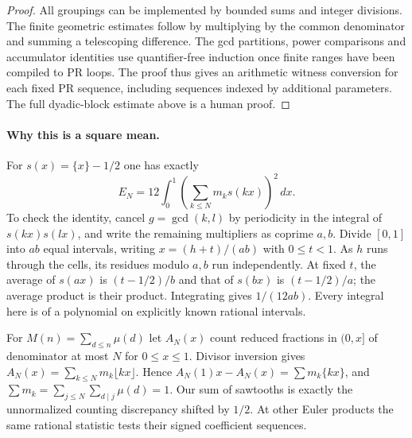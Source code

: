 \begin{proof}
All groupings can be implemented by bounded sums and integer divisions. The finite geometric estimates follow by multiplying by the common denominator and summing a telescoping difference. The gcd partitions, power comparisons and accumulator identities use quantifier-free induction once finite ranges have been compiled to PR loops. The proof thus gives an arithmetic witness conversion for each fixed PR sequence, including sequences indexed by additional parameters. The full dyadic-block estimate above is a human proof.
\end{proof}

\paragraph{Why this is a square mean.}
For $s(x)=\{x\}-1/2$ one has exactly
\[
 E_N=12\int_0^1\left(\sum_{k\le N}m_k s(kx)\right)^2\,dx .
\]
To check the identity, cancel $g=\gcd(k,l)$ by periodicity in the integral of $s(kx)s(lx)$, and write the remaining multipliers as coprime $a,b$. Divide $[0,1]$ into $ab$ equal intervals, writing $x=(h+t)/(ab)$ with $0\le t<1$. As $h$ runs through the cells, its residues modulo $a,b$ run independently. At fixed $t$, the average of $s(ax)$ is $(t-1/2)/b$ and that of $s(bx)$ is $(t-1/2)/a$; the average product is their product. Integrating gives $1/(12ab)$. Every integral here is of a polynomial on explicitly known rational intervals.

For $M(n)=\sum_{d\le n}\mu(d)$ let $A_N(x)$ count reduced fractions in $(0,x]$ of denominator at most $N$ for $0\le x\le1$. Divisor inversion gives $A_N(x)=\sum_{k\le N} m_k\lfloor kx\rfloor$. Hence $A_N(1)x-A_N(x)=\sum m_k\{kx\}$, and $\sum m_k=\sum_{j\le N}\sum_{d\mid j}\mu(d)=1$. Our sum of sawtooths is exactly the unnormalized counting discrepancy shifted by $1/2$. At other Euler products the same rational statistic tests their signed coefficient sequences.
